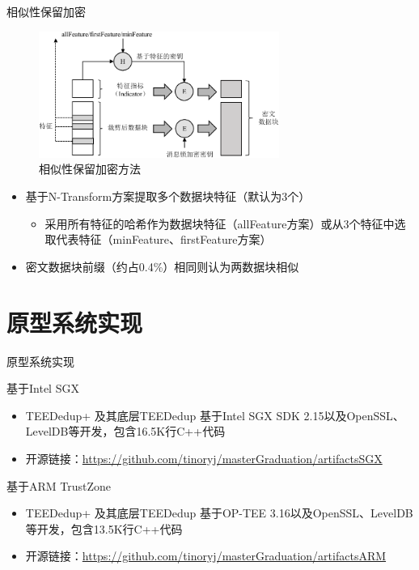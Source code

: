 \documentclass{beamer}
\newcommand{\sysnameS}{TEEDedup }
\newcommand{\prototype}{TEEDedup+ }
\begin{document}
\begin{frame}{相似性保留加密}
    \begin{figure}[!htb]
        \centering
        \includegraphics[width=0.7\textwidth]{../pic/featurespy/spe.pdf}
        \caption{相似性保留加密方法}
        \label{fig:featurespy-design-spe}
    \end{figure}
    \vspace{-1.5em}
    \begin{itemize}
        \item
              基于N-Transform方案提取多个数据块特征（默认为3个）
              \begin{itemize}
                  \item 采用所有特征的哈希作为数据块特征（allFeature方案）或从3个特征中选取代表特征（minFeature、firstFeature方案）
              \end{itemize}
        \item  密文数据块前缀（约占0.4\%）相同则认为两数据块相似
    \end{itemize}
\end{frame}

\section{原型系统实现}

\begin{frame}{原型系统实现}
    \begin{textbox}{基于Intel SGX}
        \begin{itemize}
            \item \prototype 及其底层\sysnameS 基于Intel SGX SDK 2.15以及OpenSSL、LevelDB等开发，包含16.5K行C++代码
            \item 开源链接：\href{https://github.com/tinoryj/masterGraduation/artifactsSGX}{https://github.com/tinoryj/masterGraduation/artifactsSGX}
        \end{itemize}
    \end{textbox}

    \begin{textbox}{基于ARM TrustZone}
        \begin{itemize}
            \item \prototype 及其底层\sysnameS 基于OP-TEE 3.16以及OpenSSL、LevelDB等开发，包含13.5K行C++代码
            \item 开源链接：\href{https://github.com/tinoryj/masterGraduation/artifactsARM}{https://github.com/tinoryj/masterGraduation/artifactsARM}
        \end{itemize}
    \end{textbox}
\end{frame}
\end{document}
